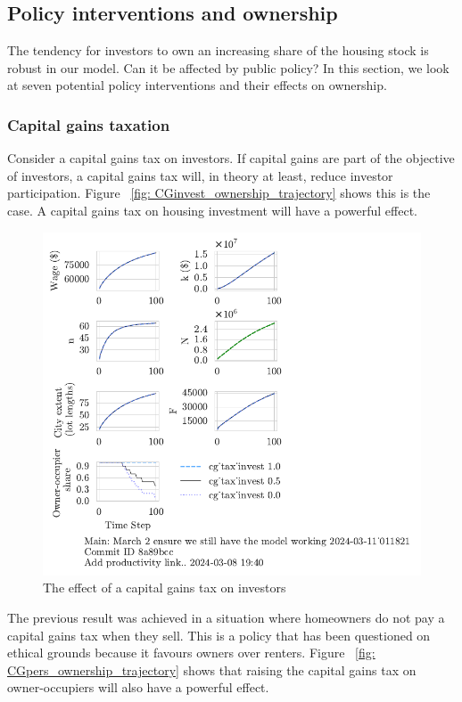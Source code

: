 \subsection{Policy interventions and ownership}
The tendency for investors to own an increasing share of the housing stock is robust in our model. Can it be affected by public policy? In this section, we look at seven potential policy interventions and their effects on ownership. 

\subsubsection{Capital gains taxation}
Consider a capital gains tax on investors. If capital gains are part of the objective of investors, a capital gains tax will, in theory at least, reduce investor participation. Figure ~\ref{fig: CGinvest_ownership_trajectory} shows this is the case. A capital gains tax on housing investment will have a powerful effect.
\begin{figure}[htb]
    \centering
    \includegraphics[scale=.8, trim={0 1.4cm 4cm 0},clip]{fig/cg_tax_invest-Main-_011821.pdf}
    \caption{The effect of a capital gains tax on investors}
    \label{fig:CGinvest_ownership_trajectory}
\end{figure}

The previous result was achieved in a situation where homeowners do not pay a capital gains tax when they sell. This is a policy that has been questioned on ethical grounds because it favours owners over renters.  Figure ~\ref{fig: CGpers_ownership_trajectory} shows that raising the capital gains tax on owner-occupiers will also have a powerful effect. 

